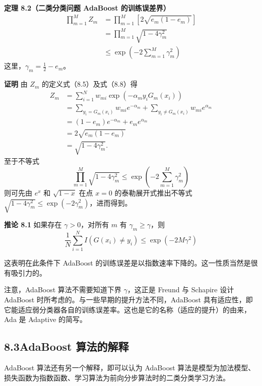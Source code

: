 \documentclass[UTF8,12pt,a4paper,fontset=fandol]{ctexart}
\begin{document}
\noindent\textbf{定理 8.2（二类分类问题 AdaBoost 的训练误差界）}\quad
\begin{equation}
\begin{aligned}
\prod_{m=1}^M Z_m
&=\prod_{m=1}^M \left[2\sqrt{e_m(1-e_m)}\right]\\
&=\prod_{m=1}^M \sqrt{1-4\gamma_m^2}\\
&\leq \exp\left(-2\sum_{m=1}^M \gamma_m^2\right)
\end{aligned}
\tag{8.10}
\end{equation}
这里，$\gamma_m=\frac{1}{2}-e_m$。

\noindent\textbf{证明}\quad
由 $Z_m$ 的定义式（8.5）及式（8.8）得
\[
\begin{aligned}
Z_m
&=\sum_{i=1}^N w_{mi}\exp(-\alpha_my_iG_m(x_i))\\
&=\sum_{y_i=G_m(x_i)}w_{mi}e^{-\alpha_m}
+\sum_{y_i\ne G_m(x_i)}w_{mi}e^{\alpha_m}\\
&=(1-e_m)e^{-\alpha_m}+e_me^{\alpha_m}\\
&=2\sqrt{e_m(1-e_m)}\\
&=\sqrt{1-4\gamma_m^2}.
\end{aligned}
\tag{8.11}
\]
至于不等式
\[
\prod_{m=1}^M \sqrt{1-4\gamma_m^2}
\leq \exp\left(-2\sum_{m=1}^M \gamma_m^2\right)
\]
则可先由 $e^x$ 和 $\sqrt{1-x}$ 在点 $x=0$ 的泰勒展开式推出不等式 $\sqrt{1-4\gamma_m^2}\leq \exp(-2\gamma_m^2)$，进而得到。

\noindent\textbf{推论 8.1}\quad
如果存在 $\gamma>0$，对所有 $m$ 有 $\gamma_m\geq \gamma$，则
\begin{equation}
\frac{1}{N}\sum_{i=1}^N I(G(x_i)\ne y_i)\leq \exp(-2M\gamma^2)
\tag{8.12}
\end{equation}

这表明在此条件下 AdaBoost 的训练误差是以指数速率下降的。这一性质当然是很有吸引力的。

注意，AdaBoost 算法不需要知道下界 $\gamma$，这正是 Freund 与 Schapire 设计 AdaBoost 时所考虑的。与一些早期的提升方法不同，AdaBoost 具有适应性，即它能适应弱分类器各自的训练误差率。这也是它的名称（适应的提升）的由来，Ada 是 Adaptive 的简写。

\subsection*{8.3\quad AdaBoost 算法的解释}

AdaBoost 算法还有另一个解释，即可以认为 AdaBoost 算法是模型为加法模型、损失函数为指数函数、学习算法为前向分步算法时的二类分类学习方法。
\end{document}

